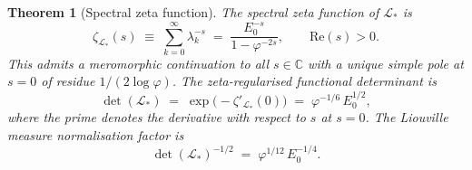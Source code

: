 \documentclass[11pt,a4paper]{article}
\newtheorem{theorem}{Theorem}[section]
\theoremstyle{definition}
\theoremstyle{remark}
\newcommand{\vp}{\varphi}
\newcommand{\CC}{\mathbb{C}}
\begin{document}
\begin{theorem}[Spectral zeta function]
\label{P10:thm:spectral_zeta}
The spectral zeta function of $\mathcal{L}_*$ is
\begin{equation}
  \boxed{\zeta_{\mathcal{L}_*}(s)
  \;\equiv\; \sum_{k=0}^{\infty} \lambda_k^{-s}
  \;=\; \frac{E_0^{-s}}{1 - \vp^{-2s}}},
  \qquad \mathrm{Re}(s) > 0.
  \label{P10:eq:zeta_exact}
\end{equation}
This admits a meromorphic continuation to all $s\in\CC$ with a unique
simple pole at $s=0$ of residue $1/(2\log\vp)$.
The zeta-regularised functional determinant is
\begin{equation}
  \det(\mathcal{L}_*) \;=\; \exp\!\bigl(-\zeta'_{\mathcal{L}_*}(0)\bigr)
  \;=\; \vp^{-1/6}\,E_0^{1/2},
  \label{P10:eq:det_exact}
\end{equation}
where the prime denotes the derivative with respect to $s$ at $s=0$.
The Liouville measure normalisation factor is
\begin{equation}
  \det(\mathcal{L}_*)^{-1/2}
  \;=\; \vp^{1/12}\,E_0^{-1/4}.
  \label{P10:eq:det_half}
\end{equation}
\end{theorem}
\end{document}
